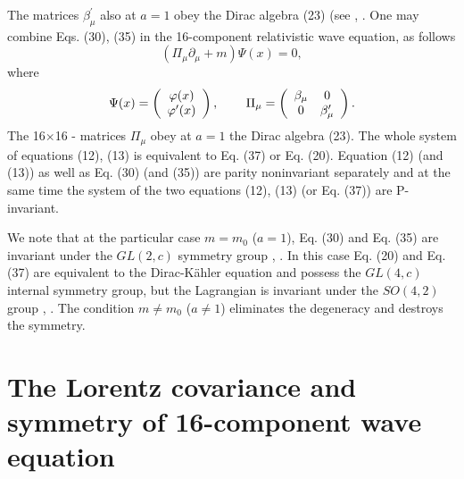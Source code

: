 \documentclass[a4paper,12pt]{article}
\begin{document}
The matrices $\beta _\mu ^{\prime }$ also at $a=1$ obey the Dirac
algebra (23) (see \cite{monogr}, \cite{Kruglov6}. One may combine
Eqs. (30), (35) in the 16-component relativistic wave equation, as
follows
\begin{equation}
\left( \Pi _\mu \partial _\mu +m\right) \Psi (x)=0 ,  \label{37}
\end{equation}
where
\begin{equation}
\Psi (x)=\left(
\begin{array}{c}
\varphi (x) \\
\varphi ^{\prime }(x)
\end{array}
\right) ,\hspace{0.3in}\Pi _\mu =\left(
\begin{array}{cc}
\beta _\mu & 0 \\
0 & \beta _\mu ^{\prime }
\end{array}
\right) .  \label{38}
\end{equation}
The 16$\times$16 - matrices $\Pi_\mu $ obey at $a=1$ the Dirac
algebra (23). The whole system of equations (12), (13) is
equivalent to Eq. (37) or Eq. (20).  Equation (12) (and (13)) as
well as Eq. (30) (and (35)) are parity noninvariant separately and
at the same time the system of the two equations (12), (13) (or
Eq. (37)) are P-invariant.

We note that at the particular case $m=m_0$ ($a=1$), Eq. (30) and
Eq. (35) are invariant under the $GL(2,c)$ symmetry group
\cite{Kruglov6}, \cite{monogr}. In this case Eq. (20) and Eq. (37)
are equivalent to the Dirac-K\"{a}hler equation and possess the
$GL(4,c)$ internal symmetry group, but the Lagrangian is invariant
under the $SO(4,2)$ group \cite{Kruglov1}, \cite{monogr}. The
condition $m\neq m_0$ ($a\neq1$) eliminates the degeneracy and
destroys the symmetry.


\section{The Lorentz covariance and symmetry of
16-component wave equation}
\end{document}

